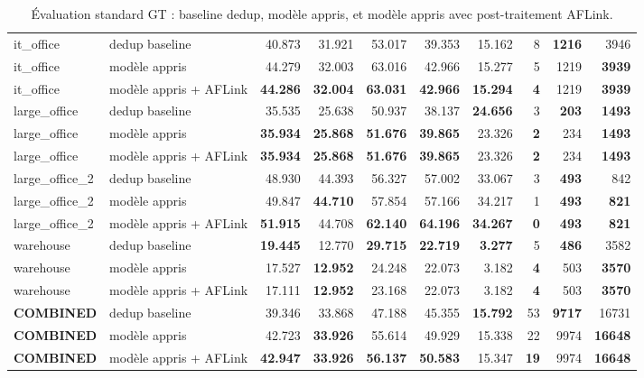 \documentclass[11pt,a4paper]{article}
\begin{document}
\begin{table}[H]
{\begin{tabular}{l l r r r r r r r r}
\midrule
it\_office & dedup baseline & 40.873 & 31.921 & 53.017 & 39.353 & 15.162 & 8 & \textbf{1216} & 3946 \\
it\_office & modèle appris & 44.279 & 32.003 & 63.016 & 42.966 & 15.277 & 5 & 1219 & \textbf{3939} \\
it\_office & modèle appris + AFLink & \textbf{44.286} & \textbf{32.004} & \textbf{63.031} & \textbf{42.966} & \textbf{15.294} & \textbf{4} & 1219 & \textbf{3939} \\
\midrule
large\_office & dedup baseline & 35.535 & 25.638 & 50.937 & 38.137 & \textbf{24.656} & 3 & \textbf{203} & \textbf{1493} \\
large\_office & modèle appris & \textbf{35.934} & \textbf{25.868} & \textbf{51.676} & \textbf{39.865} & 23.326 & \textbf{2} & 234 & \textbf{1493} \\
large\_office & modèle appris + AFLink & \textbf{35.934} & \textbf{25.868} & \textbf{51.676} & \textbf{39.865} & 23.326 & \textbf{2} & 234 & \textbf{1493} \\
\midrule
large\_office\_2 & dedup baseline & 48.930 & 44.393 & 56.327 & 57.002 & 33.067 & 3 & \textbf{493} & 842 \\
large\_office\_2 & modèle appris & 49.847 & \textbf{44.710} & 57.854 & 57.166 & 34.217 & 1 & \textbf{493} & \textbf{821} \\
large\_office\_2 & modèle appris + AFLink & \textbf{51.915} & 44.708 & \textbf{62.140} & \textbf{64.196} & \textbf{34.267} & \textbf{0} & \textbf{493} & \textbf{821} \\
\midrule
warehouse & dedup baseline & \textbf{19.445} & 12.770 & \textbf{29.715} & \textbf{22.719} & \textbf{3.277} & 5 & \textbf{486} & 3582 \\
warehouse & modèle appris & 17.527 & \textbf{12.952} & 24.248 & 22.073 & 3.182 & \textbf{4} & 503 & \textbf{3570} \\
warehouse & modèle appris + AFLink & 17.111 & \textbf{12.952} & 23.168 & 22.073 & 3.182 & \textbf{4} & 503 & \textbf{3570} \\
\midrule
\textbf{COMBINED} & dedup baseline & 39.346 & 33.868 & 47.188 & 45.355 & \textbf{15.792} & 53 & \textbf{9717} & 16731 \\
\textbf{COMBINED} & modèle appris & 42.723 & \textbf{33.926} & 55.614 & 49.929 & 15.338 & 22 & 9974 & \textbf{16648} \\
\textbf{COMBINED} & modèle appris + AFLink & \textbf{42.947} & \textbf{33.926} & \textbf{56.137} & \textbf{50.583} & 15.347 & \textbf{19} & 9974 & \textbf{16648} \\
\bottomrule
\end{tabular}
}
\caption{Évaluation standard GT : baseline dedup, modèle appris, et modèle appris avec post-traitement AFLink.}
\end{table}
\end{document}
